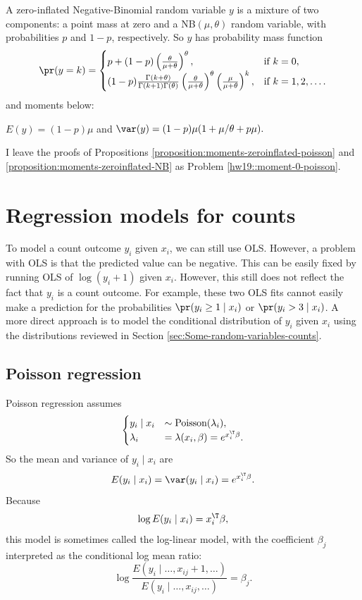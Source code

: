 A zero-inflated Negative-Binomial random variable $y$ is a mixture
of two components: a point mass at zero and a NB$(\mu,\theta)$ random
variable, with probabilities $p$ and $1-p$, respectively. So $y$
has probability mass function
\[
\pr(y=k)=\begin{cases}
p+(1-p)\left(\frac{\theta}{\mu+\theta}\right)^{\theta}, & \text{if }k=0,\\
(1-p)\frac{\Gamma(k+\theta)}{\Gamma(k+1)\Gamma(\theta)}\left(\frac{\theta}{\mu+\theta}\right)^{\theta}\left(\frac{\mu}{\mu+\theta}\right)^{k}, & \text{if }k=1,2,\ldots.
\end{cases}
\]
and moments below:
\begin{proposition}
\label{proposition:moments-zeroinflated-NB}$E(y)=(1-p)\mu$ and $\var(y)=(1-p) \mu (1+\mu/\theta+p\mu).$
\end{proposition}


I leave the proofs of Propositions \ref{proposition:moments-zeroinflated-poisson} and \ref{proposition:moments-zeroinflated-NB} as Problem \ref{hw19::moment-0-poisson}. 

\section{Regression models for counts}

To model a count outcome $y_{i}$ given $x_{i}$, we can still use
OLS. However, a problem with OLS is that the predicted value can be negative.
This can be easily fixed by running OLS of $\log(y_{i}+1)$ given
$x_{i}$. However, this still does not reflect the fact that $y_{i}$
is a count outcome. For example, these two OLS fits cannot easily make
a prediction for the probabilities $\pr(y_{i}\geq1\mid x_{i})$ or
$\pr(y_{i}>3\mid x_{i})$. A more direct approach is to model the
conditional distribution of $y_{i}$ given $ x_{i}$ using the distributions
reviewed in Section \ref{sec:Some-random-variables-counts}.

\subsection{Poisson regression}

Poisson regression assumes 
\begin{align*}
\begin{cases}
y_{i}  \mid  x_{i} &\sim\text{Poisson}(\lambda_{i}),\\
\lambda_{i} & = \lambda(x_{i},\beta)=e^{x_{i}^{\T}\beta}.
\end{cases}
\end{align*}
So the mean and variance of $y_{i}\mid x_{i}$ are
\[
E(y_{i}\mid x_{i})=\var(y_{i}\mid x_{i})=e^{x_{i}^{\T}\beta}.
\]
Because 
\[
\log E(y_{i}\mid x_{i})=x_{i}^{\T}\beta,
\]
this model is sometimes called the log-linear model, with the coefficient
$\beta_{j}$ interpreted as the conditional log mean ratio:
\[
\log\frac{E(y_{i}\mid  \ldots,x_{ij}+1,\ldots )}{E(y_{i}\mid  \ldots,x_{ij},\ldots )}=\beta_{j}.
\]


